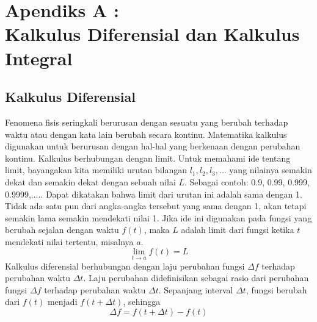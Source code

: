 \chapter*{Apendiks A :\\ Kalkulus Diferensial dan Kalkulus Integral}
\section{Kalkulus Diferensial}
Fenomena fisis seringkali berurusan dengan sesuatu yang berubah terhadap waktu atau dengan kata lain berubah secara kontinu. Matematika kalkulus digunakan untuk berurusan dengan hal-hal yang berkenaan dengan perubahan kontinu. Kalkulus berhubungan dengan limit. Untuk memahami ide tentang limit, bayangakan kita memiliki urutan bilangan $l_1, l_2, l_3,...$ yang nilainya semakin dekat dan semakin dekat dengan sebuah nilai $L$. Sebagai contoh: 0.9, 0.99, 0.999, 0.9999,..... Dapat dikatakan bahwa limit dari urutan ini adalah sama dengan 1. Tidak ada satu pun dari angka-angka tersebut yang sama dengan 1, akan tetapi semakin lama semakin mendekati nilai 1. Jika ide ini digunakan pada fungsi yang berubah sejalan dengan waktu $f(t)$, maka $L$ adalah limit dari fungsi ketika $t$ mendekati nilai tertentu, misalnya $a$.
\begin{equation}
\lim_{t\rightarrow a}f(t)=L 
\end{equation}
Kalkulus diferensial berhubungan dengan laju perubahan fungsi $\Delta f$ terhadap perubahan waktu $\Delta t$. Laju perubahan didefinisikan sebagai rasio dari perubahan fungsi $\Delta f$ terhadap perubahan waktu $\Delta t$. Sepanjang interval $\Delta t$, fungsi berubah dari $f(t)$ menjadi $f(t+\Delta t)$, sehingga
\begin{equation}
\Delta f = f(t+\Delta t) - f(t)
\end{equation}
